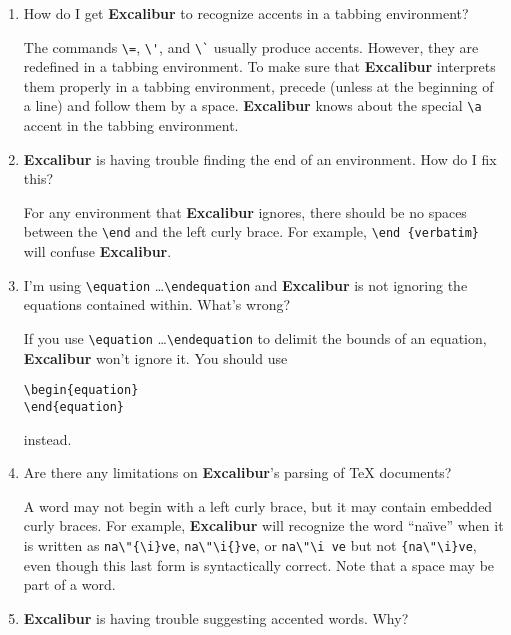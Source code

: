 \documentclass[11pt,titlepage]{article}
\newcommand{\ex}{\textbf{Excalibur}}
\begin{document}
\begin{enumerate}
  \ex{} knows a fair amount about \TeX/\LaTeX{} syntax. If it looks
  like it's skipping large portions of a file, it's probably because
  of an unmatched brace or some other syntax error. It's best to run
  it on a syntactically correct file. It will warn you if it thinks it
  found a syntax error.

\item How do I get \ex{} to recognize accents in a tabbing
  environment?

  The commands \verb+\=+, \verb+\'+, and \verb+\`+ usually produce
  accents. However, they are redefined in a tabbing environment. To
  make sure that \ex{} interprets them properly in a tabbing
  environment, precede (unless at the beginning of a line) and follow
  them by a space. \ex{} knows about the special \verb+\a+ accent in
  the tabbing environment.

\item \ex{} is having trouble finding the end of an environment.  How
  do I fix this?

  For any environment that \ex{} ignores, there should be no spaces
  between the \verb+\end+ and the left curly brace. For example,
  \verb+\end {verbatim}+ will confuse \ex.

\item I'm using \verb+\equation+ \ldots \verb+\endequation+ and
  \ex{} is not ignoring the equations contained within.  What's wrong?

  If you use \verb+\equation+ \ldots \verb+\endequation+ to delimit
  the bounds of an equation, \ex{} won't ignore it. You should use
\begin{verbatim}
\begin{equation}
\end{equation}
\end{verbatim}
  instead.

\item Are there any limitations on \ex's parsing of \TeX{} documents?

  A word may not begin with a left curly brace, but it may contain
  embedded curly braces. For example, \ex{} will recognize the word
  ``na\"\i ve'' when it is written as \verb+na\"{\i}ve+,
  \verb+na\"\i{}ve+, or \verb+na\"\i ve+ but not \verb+{na\"\i}ve+,
  even though this last form is syntactically correct. Note that a
  space may be part of a word.

\item \ex{} is having trouble suggesting accented words.  Why?


\end{enumerate}
\end{document}
